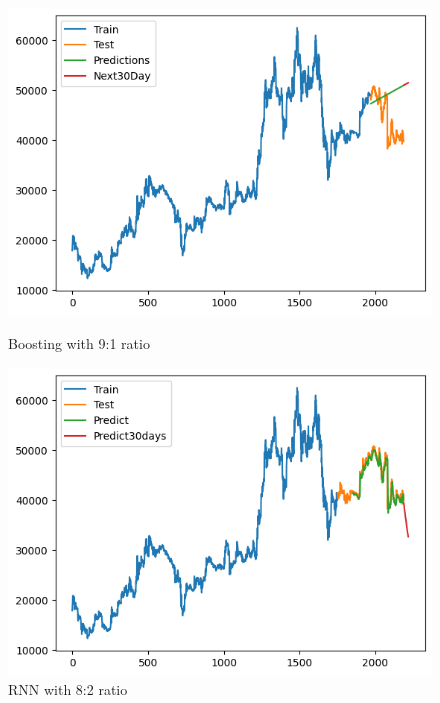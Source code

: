 \documentclass[conference]{IEEEtran}
\begin{document}
\begin{figure}[H]
    \centering
    \begin{minipage}{0.24\textwidth}
        \centering
        \includegraphics[width=\textwidth]{Figure/CMG/boosting91.png}
        \caption{Boosting with 9:1 ratio}
        \label{fig:image1}
    \end{minipage}
    \hfill
    \begin{minipage}{0.24\textwidth}
        \centering
        \includegraphics[width=\textwidth]{Figure/CMG/rnn82.png}
        \caption{RNN with 8:2 ratio}
        \label{fig:image2}
    \end{minipage}
\end{figure}
\end{document}
